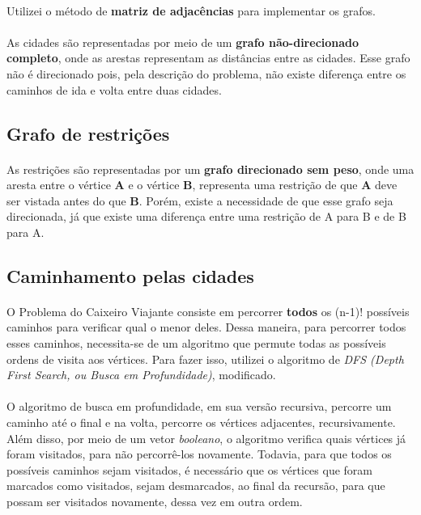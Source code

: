 \documentclass[a4paper, 12pt]{article}
\begin{document}
\paragraph{}
Utilizei o método de \textbf{matriz de adjacências} para implementar os grafos.
\paragraph{}
As cidades são representadas por meio de um \textbf{grafo não-direcionado completo}, onde as arestas representam as distâncias entre as cidades. Esse grafo não é direcionado pois, pela descrição do problema, não existe diferença entre os caminhos de ida e volta entre duas cidades.


\subsection{Grafo de restrições}
\paragraph{}
As restrições são representadas por um \textbf{grafo direcionado sem peso}, onde uma aresta entre o vértice \textbf{A} e o vértice \textbf{B}, representa uma restrição de que \textbf{A} deve ser vistada antes do que \textbf{B}. Porém, existe a necessidade de que esse grafo seja direcionada, já que existe uma diferença entre uma restrição de A para B e de B para A.

\subsection{Caminhamento pelas cidades}
\paragraph{}
O Problema do Caixeiro Viajante consiste em percorrer \textbf{todos} os (n-1)! possíveis caminhos para verificar qual o menor deles. Dessa maneira, para percorrer todos esses caminhos, necessita-se de um algoritmo que permute todas as possíveis ordens de visita aos vértices. Para fazer isso, utilizei o algoritmo de \textit{DFS (Depth First Search, ou Busca em Profundidade)}, modificado. 
\paragraph{}
O algoritmo de busca em profundidade, em sua versão recursiva, percorre um caminho até o final e na volta, percorre os vértices adjacentes, recursivamente. Além disso, por meio de um vetor \textit{booleano}, o algoritmo verifica quais vértices já foram visitados, para não percorrê-los novamente. Todavia, para que todos os possíveis caminhos sejam visitados, é necessário que os vértices que foram marcados como visitados, sejam desmarcados, ao final da recursão, para que possam ser visitados novamente, dessa vez em outra ordem.
\end{document}
